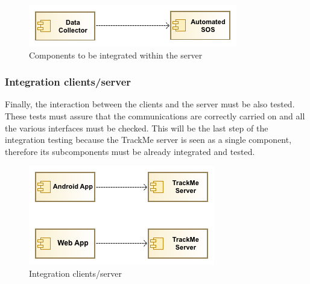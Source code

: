 \begin{figure}[H]
\centering
\includegraphics[scale=0.7]{resources/uml/integration/server}
\caption{Components to be integrated within the server}
\end{figure}


\subsubsection{Integration clients/server}
Finally, the interaction between the clients and the server must be also tested.
These tests must assure that the communications are correctly carried on and all the various interfaces must be checked.
This will be the last step of the integration testing because the TrackMe server is seen as a single component, therefore its subcomponents must be already integrated and tested.

\begin{figure}[H]
\centering
\includegraphics[scale=0.7]{resources/uml/integration/clients}
\caption{Integration clients/server}
\end{figure}



